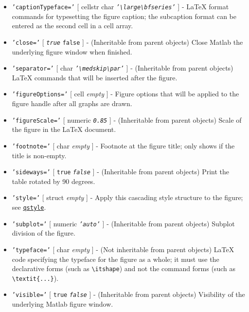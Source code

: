 \begin{itemize}
\item
  \texttt{'captionTypeface='} {[} cellstr \textbar{} char \textbar{}
  \emph{\texttt{'\textbackslash{}large\textbackslash{}bfseries'}} {]} -
  LaTeX format commands for typesetting the figure caption; the
  subcaption format can be entered as the second cell in a cell array.
\item
  \texttt{'close='} {[} \emph{\texttt{true}} \textbar{} \texttt{false}
  {]} - (Inheritable from parent objects) Close Matlab the underlying
  figure window when finished.
\item
  \texttt{'separator='} {[} char \textbar{}
  \emph{\texttt{'\textbackslash{}medskip\textbackslash{}par'}} {]} -
  (Inheritable from parent objects) LaTeX commands that will be inserted
  after the figure.
\item
  \texttt{'figureOptions='} {[} cell \textbar{} \emph{empty} {]} -
  Figure options that will be applied to the figure handle after all
  graphs are drawn.
\item
  \texttt{'figureScale='} {[} numeric \textbar{} \emph{\texttt{0.85}}
  {]} - (Inheritable from parent objects) Scale of the figure in the
  LaTeX document.
\item
  \texttt{'footnote='} {[} char \textbar{} \emph{empty} {]} - Footnote
  at the figure title; only shows if the title is non-empty.
\item
  \texttt{'sideways='} {[} \texttt{true} \textbar{}
  \emph{\texttt{false}} {]} - (Inheritable from parent objects) Print
  the table rotated by 90 degrees.
\item
  \texttt{'style='} {[} struct \textbar{} \emph{empty} {]} - Apply this
  cascading style structure to the figure; see
  \href{qreport/qstyle}{\texttt{qstyle}}.
\item
  \texttt{'subplot='} {[} numeric \textbar{} \emph{\texttt{'auto'}} {]}
  - (Inheritable from parent objects) Subplot division of the figure.
\item
  \texttt{'typeface='} {[} char \textbar{} \emph{empty} {]} - (Not
  inheritable from parent objects) LaTeX code specifying the typeface
  for the figure as a whole; it must use the declarative forms (such as
  \texttt{\textbackslash{}itshape}) and not the command forms (such as
  \texttt{\textbackslash{}textit\{...\}}).
\item
  \texttt{'visible='} {[} \texttt{true} \textbar{} \emph{\texttt{false}}
  {]} - (Inheritable from parent objects) Visibility of the underlying
  Matlab figure window.
\end{itemize}

